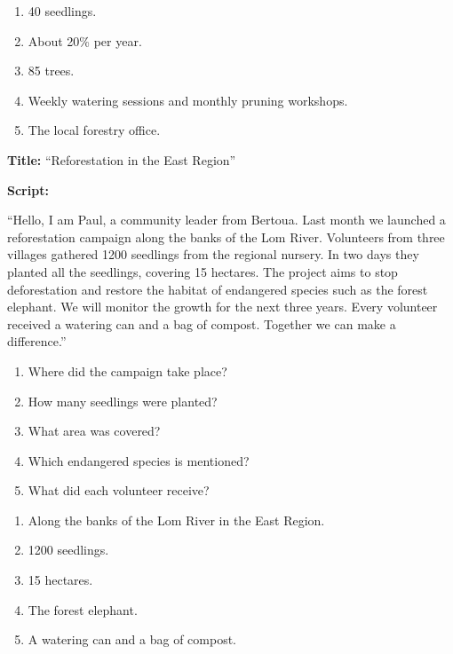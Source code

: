 \documentclass[11pt]{article}
\newcommand{\cle}[1]{{\popxbold\color{popdark}#1}}
\begin{document}
\begin{corrige}[Exercice 1]
\begin{enumerate}
\item 40 seedlings.
\item About 20\% per year.
\item 85 trees.
\item Weekly watering sessions and monthly pruning workshops.
\item The local forestry office.
\end{enumerate}
\end{corrige}

\begin{exemplebox}
\textbf{Title:} ``Reforestation in the East Region''

\textbf{Script:}

``Hello, I am Paul, a community leader from Bertoua. Last month we launched a \cle{reforestation} campaign along the banks of the Lom River. Volunteers from three villages gathered 1200 \cle{seedling}s from the regional \cle{nursery}. In two days they planted all the seedlings, covering 15 hectares. The project aims to stop \cle{deforestation} and restore the \cle{habitat} of \cle{endangered species} such as the forest elephant. We will monitor the growth for the next three years. Every volunteer received a \cle{watering can} and a bag of \cle{compost}. Together we can make a difference.''
\end{exemplebox}

\begin{exercice}
\begin{enumerate}
\item Where did the campaign take place?
\item How many seedlings were planted?
\item What area was covered?
\item Which endangered species is mentioned?
\item What did each volunteer receive?
\end{enumerate}
\end{exercice}

\begin{corrige}[Exercice 2]
\begin{enumerate}
\item Along the banks of the Lom River in the East Region.
\item 1200 seedlings.
\item 15 hectares.
\item The forest elephant.
\item A watering can and a bag of compost.
\end{enumerate}
\end{corrige}
\end{document}
